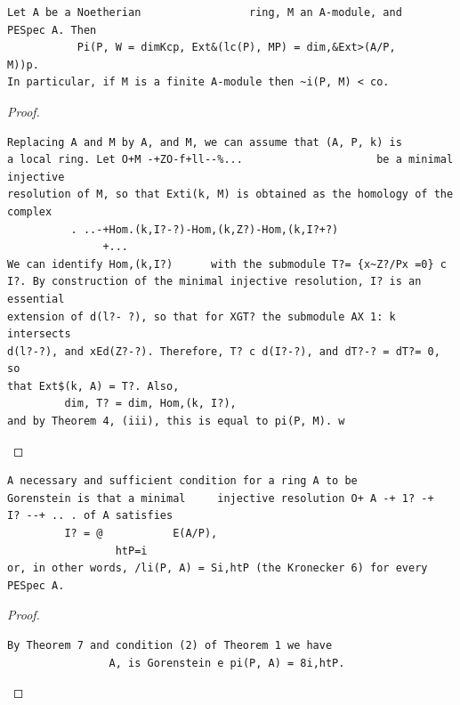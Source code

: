 \begin{theorem}\label{mcrt-auto-theorem-18-7}\uses{}
\begin{verbatim}
Let A be a Noetherian                 ring, M an A-module, and
PESpec A. Then
           Pi(P, W = dimKcp, Ext&(lc(P), MP) = dim,&Ext>(A/P,          M))p.
In particular, if M is a finite A-module then ~i(P, M) < co.
\end{verbatim}
\end{theorem}
\begin{proof}
\begin{verbatim}
Replacing A and M by A, and M, we can assume that (A, P, k) is
a local ring. Let O+M -+ZO-f+ll--%...                     be a minimal    injective
resolution of M, so that Exti(k, M) is obtained as the homology of the
complex
          . ..-+Hom.(k,I?-?)-Hom,(k,Z?)-Hom,(k,I?+?)
               +...
We can identify Hom,(k,I?)      with the submodule T?= {x~Z?/Px =0} c
I?. By construction of the minimal injective resolution, I? is an essential
extension of d(l?- ?), so that for XGT? the submodule AX 1: k intersects
d(l?-?), and xEd(Z?-?). Therefore, T? c d(I?-?), and dT?-? = dT?= 0, so
that Ext$(k, A) = T?. Also,
         dim, T? = dim, Hom,(k, I?),
and by Theorem 4, (iii), this is equal to pi(P, M). w
\end{verbatim}
\end{proof}


\begin{theorem}\label{mcrt-auto-theorem-18-8}\uses{}
\begin{verbatim}
A necessary and sufficient condition for a ring A to be
Gorenstein is that a minimal     injective resolution O+ A -+ 1? -+
I? --+ .. . of A satisfies
         I? = @           E(A/P),
                 htP=i
or, in other words, /li(P, A) = Si,htP (the Kronecker 6) for every PESpec A.
\end{verbatim}
\end{theorem}
\begin{proof}
\begin{verbatim}
By Theorem 7 and condition (2) of Theorem 1 we have
                A, is Gorenstein e pi(P, A) = 8i,htP.
\end{verbatim}
\end{proof}


